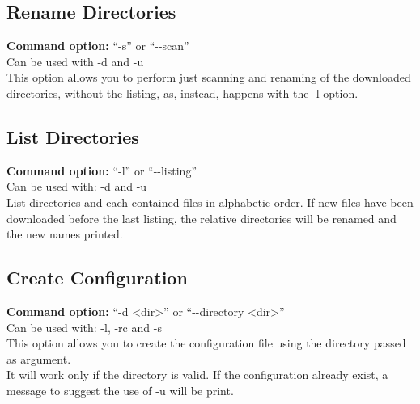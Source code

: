 \documentclass[hidelinks,12pt]{article}
\begin{document}

\subsection{Rename Directories}
\textbf{Command option:} ``-s'' or ``-\hspace{0.1 pt}-scan''
\vspace{10 pt}
\\Can be used with -d and -u\\
This option allows you to perform just scanning and renaming of the downloaded directories, without the listing, as, 
instead, happens with the -l option.


\subsection{List Directories}
\textbf{Command option:} ``-l'' or ``-\hspace{0.1 pt}-listing''
\vspace{10 pt}
\\Can be used with: -d and -u \\
List directories and each contained files in alphabetic order. If new files have been downloaded before the last listing, the relative directories will be renamed and the new names printed.



\subsection{Create Configuration}
\textbf{Command option:} ``-d <dir>'' or ``-\hspace{0.1 pt}-directory <dir>''
\vspace{10 pt}
\\Can be used with: -l, -rc and -s\\
This option allows you to create the configuration file using the directory passed as argument. \\ It will work only if the directory is valid. If the configuration already exist, a message to suggest the use of -u will be print.

\end{document}
